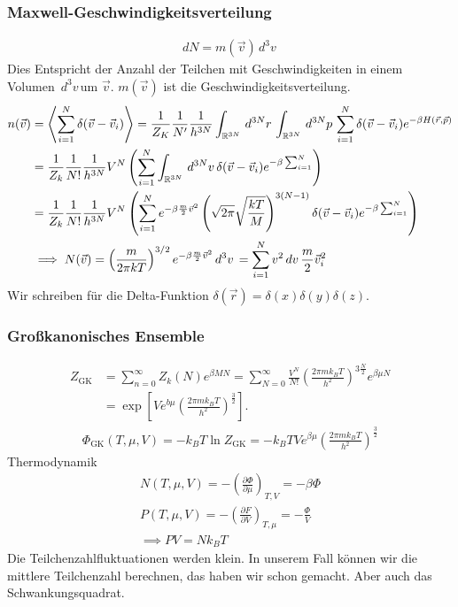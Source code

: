 \documentclass[11pt]{article}
\theoremstyle{plain}
\theoremstyle{mytheoremstyle}
\newcommand{\R}{\mathbb{R}}
\newcommand{\pd}[2]{\frac{\partial #1 }{\partial #2}}
\newcommand{\GK}{\text{GK}}
\renewcommand{\d}[1]{\,d#1\,}
\begin{document}
\subsubsection*{Maxwell-Geschwindigkeitsverteilung}
%
\begin{align*}
  dN = m(\vec{v}) \d{^3 v}
\end{align*}
%
Dies Entspricht der Anzahl der Teilchen mit Geschwindigkeiten 
in einem Volumen $ \d{^3v }$um $\vec{v}$.
$m(\vec{v})$ ist die Geschwindigkeitsverteilung.
%
\begin{align*}
  n(\vec{v}) & = \Braket{ \sum_{i=1}^{ N } \delta(\vec{v} - \vec{v}_i)} 
              = \frac{1}{Z_K} \frac{1}{N'} \frac{1}{h^{3N}} 
  \int_{\R^{3N}}^{} \d{^{3N}r}\int_{\R^{3N}}^{} \d{^{3N} p }
  \sum_{i=1}^{N} \delta(\vec{v} - \vec{v}_i) e^{-\beta H (\vec{r}, \vec{p})} \\
  & = \frac{1}{Z_k} \frac{1}{N!} \frac{1}{h^{3N}} V^N 
  \left( 
    \sum_{i=1}^{N} \int_{\R^{3N}}^{} \d{^{3N}v}
    \delta (\vec{v} - \vec{v}_i) e^{-\beta \sum_{i=1}^{N} }
    \right) \\
  & = \frac{1}{Z_k} \frac{1}{N!} \frac{1}{h^{3N}} V^N
  \left(   \sum_{i=1}^{N} e^{-\beta \frac{m}{2} \vec{v}^2}
    \left( \sqrt{2 \pi} \sqrt{\frac{kT}{M}} \right)^{3(N-1)}
    \delta (\vec{v} - \vec{v}_i) e ^{-\beta \sum_{i=1}^{N}} \right) \\
     & \implies N(\vec{v})  = \left( \frac{m}{2 \pi k T} \right) ^{3/2}
      e^{-\beta \frac{m}{2} \vec{v}^2}
      \d{^3 v}  = \sum_{i=1}^{N} v^2 \d{v}
  \frac{m}{2} \vec{v}_i^2 
\end{align*}
%
Wir schreiben f\"ur die Delta-Funktion $\delta(\vec{r}) = \delta(x) \delta(y)
\delta(z)$.

\subsubsection*{Gro\ss{}kanonisches Ensemble}
%
\begin{align*}
  Z_{\GK} & = \sum_{n=0}^{\infty} Z_k (N) e^{ \beta M N} = 
  \sum_{N=0}^{\infty} \frac{V^N}{N!} \left( \frac{2 \pi m k_B T}{h^2} \right) 
  ^{3 \frac{N}{2}} e^{\beta \mu N} \\
& = \exp\left[ V e^{b \mu} \left(  \frac{2 \pi m k_B T}{ h^2} \right)^{\frac{3}{2}} \right].
\end{align*}
%
%
\begin{align*}
  \Phi_{\GK} (T, \mu, V) = -k_B T \ln{Z_\GK} = -k_B T V e^{\beta \mu}
  \left( \frac{2 \pi m k_B T}{ h^2} \right)^{\frac{3}{2}}
\end{align*}
%
Thermodynamik
%
\begin{align*}
  N(T, \mu, V) = - \left( \pd{\Phi}{\mu} \right)_{T,V} = 
  - \beta \Phi \\
  P(T, \mu, V) = - \left( \pd{F}{V} \right)_{T, \mu} = 
  - \frac{\Phi}{V} \\
  \implies PV = N k_B T 
\end{align*}
%
Die Teilchenzahlfluktuationen werden klein. In unserem Fall k\"onnen
wir die mittlere Teilchenzahl berechnen, das haben wir schon gemacht.
Aber auch das Schwankungsquadrat.
\end{document}
